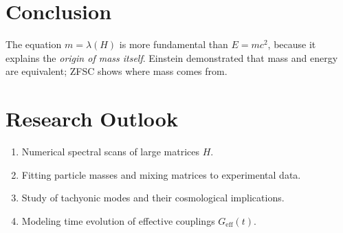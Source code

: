 \documentclass[12pt,a4paper]{article}
\begin{document}
\section*{Conclusion}
The equation $m=\lambda(H)$ is more fundamental than $E=mc^2$, because it explains the \emph{origin of mass itself}.  
Einstein demonstrated that mass and energy are equivalent; ZFSC shows where mass comes from.  

\section*{Research Outlook}
\begin{enumerate}
  \item Numerical spectral scans of large matrices $H$.
  \item Fitting particle masses and mixing matrices to experimental data.
  \item Study of tachyonic modes and their cosmological implications.
  \item Modeling time evolution of effective couplings $G_\mathrm{eff}(t)$.
\end{enumerate}
\end{document}
